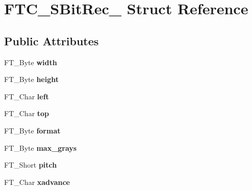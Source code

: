 \hypertarget{struct_f_t_c___s_bit_rec__}{}\section{F\+T\+C\+\_\+\+S\+Bit\+Rec\+\_\+ Struct Reference}
\label{struct_f_t_c___s_bit_rec__}
\subsection*{Public Attributes}
\begin{DoxyCompactItemize}
\item 
F\+T\+\_\+\+Byte {\bfseries width}\hypertarget{struct_f_t_c___s_bit_rec___a5b92fb4f213a880f758bb87ac2ceb263}{}\label{struct_f_t_c___s_bit_rec___a5b92fb4f213a880f758bb87ac2ceb263}

\item 
F\+T\+\_\+\+Byte {\bfseries height}\hypertarget{struct_f_t_c___s_bit_rec___a5953efe2aded3b184875d5e5d08cafef}{}\label{struct_f_t_c___s_bit_rec___a5953efe2aded3b184875d5e5d08cafef}

\item 
F\+T\+\_\+\+Char {\bfseries left}\hypertarget{struct_f_t_c___s_bit_rec___aef273749f4fdb9943500ec6df8412a94}{}\label{struct_f_t_c___s_bit_rec___aef273749f4fdb9943500ec6df8412a94}

\item 
F\+T\+\_\+\+Char {\bfseries top}\hypertarget{struct_f_t_c___s_bit_rec___a3e558b3a04b70f00f80b862cdc94d9a2}{}\label{struct_f_t_c___s_bit_rec___a3e558b3a04b70f00f80b862cdc94d9a2}

\item 
F\+T\+\_\+\+Byte {\bfseries format}\hypertarget{struct_f_t_c___s_bit_rec___a3d3fcc2869ce5c95f0f63898e6cef8be}{}\label{struct_f_t_c___s_bit_rec___a3d3fcc2869ce5c95f0f63898e6cef8be}

\item 
F\+T\+\_\+\+Byte {\bfseries max\+\_\+grays}\hypertarget{struct_f_t_c___s_bit_rec___a83958d4649a898312de9a7274550dff9}{}\label{struct_f_t_c___s_bit_rec___a83958d4649a898312de9a7274550dff9}

\item 
F\+T\+\_\+\+Short {\bfseries pitch}\hypertarget{struct_f_t_c___s_bit_rec___a1382ec014df599e706c2c1785bc18235}{}\label{struct_f_t_c___s_bit_rec___a1382ec014df599e706c2c1785bc18235}

\item 
F\+T\+\_\+\+Char {\bfseries xadvance}\hypertarget{struct_f_t_c___s_bit_rec___a502a0bb69d973d2ae626a842eb9fefd3}{}\label{struct_f_t_c___s_bit_rec___a502a0bb69d973d2ae626a842eb9fefd3}


\end{DoxyCompactItemize}
